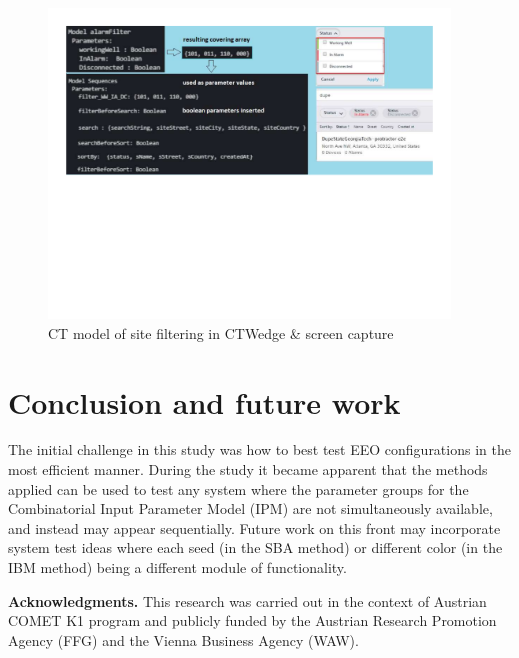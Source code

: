 \documentclass[conference]{IEEEtran}
\begin{document}
	\begin{figure}[!hb]
		\centering
			\includegraphics[width=0.95\textwidth,]{siteFilterModel.pdf}
			\caption{CT model of site filtering in CTWedge \& screen capture}
			\label{fig:siteFilterModel}
	\end{figure}
	

\section{Conclusion and future work}
	
The initial challenge in this study was how to best test EEO configurations in the most efficient manner.
During the study it became apparent that the methods applied can be used to test any system where the parameter groups for
the Combinatorial Input Parameter Model (IPM) are not simultaneously available, and instead may appear sequentially.
Future work on this front may incorporate system test ideas where each seed (in the SBA method) or different color (in the IBM method) being a different module of functionality.

\textbf{Acknowledgments.}
This research was carried out in the context of Austrian COMET K1
program and publicly funded by the Austrian Research Promotion Agency
(FFG) and the Vienna Business Agency (WAW).



\end{document}
